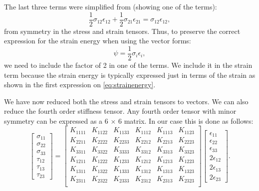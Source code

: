 \documentclass{article}
\begin{document}
The last three terms were simplified from (showing one of the terms):
\begin{equation}
    \frac{1}{2}\sigma_{12} \epsilon_{12} + \frac{1}{2}\sigma_{21} \epsilon_{21} = \sigma_{12} \epsilon_{12},
\end{equation}
from symmetry in the stress and strain tensors.  Thus, to preserve the correct expression for the strain energy when using the vector forms:
\begin{equation}
\psi = \frac{1}{2} \sigma_i \epsilon_i,
\end{equation}
we need to include the factor of 2 in one of the terms.  We include it in the strain term because the strain energy is typically expressed just in terms of the strain as shown in the first expression on \cref{eq:strainenergy}.

We have now reduced both the stress and strain tensors to vectors.  We can also reduce the fourth order stiffness tensor.  Any fourth order tensor with minor symmetry can be expressed as a 6 $\times$ 6 matrix.  In our case this is done as follows:
\begin{equation}
\left[
\begin{matrix}
\sigma_{11}\\
\sigma_{22}\\
\sigma_{33}\\
\tau_{12}\\
\tau_{13}\\
\tau_{23}
\end{matrix}
\right]
=
\left[
\begin{matrix}
K_{1111} & K_{1122} & K_{1133} & K_{1112} & K_{1113} & K_{1123} \\
K_{2211} & K_{2222} & K_{2233} & K_{2212} & K_{2213} & K_{2223} \\
K_{3311} & K_{3322} & K_{3333} & K_{3312} & K_{3313} & K_{3323} \\
K_{1211} & K_{1222} & K_{1233} & K_{1212} & K_{1213} & K_{1223} \\
K_{1311} & K_{1322} & K_{1333} & K_{1312} & K_{1313} & K_{1323} \\
K_{2311} & K_{2322} & K_{2333} & K_{2312} & K_{2313} & K_{2323} \\
\end{matrix}
\right]
\left[
\begin{matrix}
\epsilon_{11}\\
\epsilon_{22}\\
\epsilon_{33}\\
2 \epsilon_{12}\\
2 \epsilon_{13}\\
2 \epsilon_{23}
\end{matrix}
\right].
\label{eq:constitutive1}
\end{equation}
\end{document}
